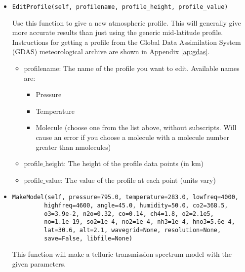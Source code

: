 \documentclass{article}
\begin{document}
\begin{itemize}
  \item \begin{Verbatim}[commandchars=\\\{\}]
EditProfile(self, profilename, profile_height, profile_value)
    \end{Verbatim}
   Use this function to give a new atmospheric profile. This will generally give more accurate results than just using the generic mid-latitude profile. Instructions for getting a profile from the Global Data Assimilation System (GDAS) meteorological archive are shown in Appendix \ref{ap:gdas}.
  
  \begin{itemize}
  \item profilename: The name of the profile you want to edit. Available names are:
  \begin{itemize}
    \item Pressure
    \item Temperature
    \item Molecule (choose one from the list above, without subscripts. Will cause an error if you choose a molecule with a molecule number greater than nmolecules)
  \end{itemize}
  \item profile$\_$height: The height of the profile data points (in km)
  \item profile$\_$value: The value of the profile at each point (units vary)
  \end{itemize}
  
  \item \begin{Verbatim}[commandchars=\\\{\}]
MakeModel(self, pressure=795.0, temperature=283.0, lowfreq=4000,
         highfreq=4600, angle=45.0, humidity=50.0, co2=368.5,
         o3=3.9e-2, n2o=0.32, co=0.14, ch4=1.8, o2=2.1e5, 
         no=1.1e-19, so2=1e-4, no2=1e-4, nh3=1e-4, hno3=5.6e-4,
         lat=30.6, alt=2.1, wavegrid=None, resolution=None, 
         save=False, libfile=None)
    \end{Verbatim}
   This function will make a telluric transmission spectrum model with the given parameters.
   
   \begin{itemize}
     

\end{itemize}
\end{itemize}
\end{document}

